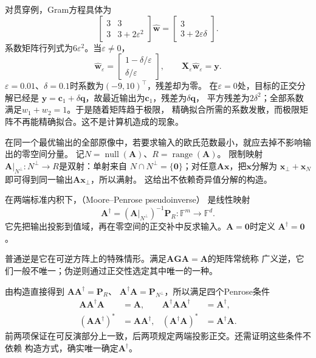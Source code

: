 对贯穿例，Gram方程具体为
\[
 \begin{bmatrix}3&3\\3&3+2\varepsilon^2\end{bmatrix}\widehat{\bm w}
 =\begin{bmatrix}3\\3+2\varepsilon\delta\end{bmatrix}.
\]
系数矩阵行列式为$6\varepsilon^2$。当$\varepsilon\neq0$，
\begin{equation}
 \widehat{\bm w}_\varepsilon
 =\begin{bmatrix}1-\delta/\varepsilon\\\delta/\varepsilon\end{bmatrix},
 \qquad\bm X_\varepsilon\widehat{\bm w}_\varepsilon=\bm y.
 \label{eq:linear-algebra-nearly-collinear-least-squares}
\end{equation}
$\varepsilon=0.01$、$\delta=0.1$时系数为$(-9,10)^\top$，残差却为零。
在$\varepsilon=0$处，目标的正交分解已经是
$\bm y=\bm c_1+\delta\bm q$，故最近输出为$\bm c_1$，残差为$\delta\bm q$，
平方残差为$2\delta^2$；全部系数满足$w_1+w_2=1$。于是随着矩阵趋于极限，
精确拟合所需的系数发散，而极限矩阵不再能精确拟合。这不是计算机造成的现象。


在同一个最优输出的全部原像中，若要求输入的欧氏范数最小，就应去掉不影响输出的零空间分量。
记$N=\operatorname{null}(\bm A)$、$R=\operatorname{range}(\bm A)$。
限制映射$\bm A|_{N^\perp}:N^\perp\to R$是双射：单射来自
$N\cap N^\perp=\{\bm0\}$；对任意$\bm A\bm x$，把$\bm x$分解为
$\bm x_\perp+\bm x_N$即可得到同一输出$\bm A\bm x_\perp$，所以满射。
这给出不依赖奇异值分解的构造。

\begin{definition}
\label{def:matrix-analysis-pseudoinverse}
在两端标准内积下，（Moore--Penrose pseudoinverse）
是线性映射
\[
 \bm A^\dagger=(\bm A|_{N^\perp})^{-1}\bm P_R:
 \mathbb F^m\longrightarrow\mathbb F^d.
\]
它先把输出投影到值域，再在零空间的正交补中反求输入。$\bm A=\bm0$时定义
$\bm A^\dagger=\bm0$。
\end{definition}
普通逆是它在可逆方阵上的特殊情形。满足$\bm A\bm G\bm A=\bm A$的矩阵常统称
广义逆，它们一般不唯一；伪逆则通过正交性选定其中唯一的一种。

由构造直接得到
$\bm A\bm A^\dagger=\bm P_R$、
$\bm A^\dagger\bm A=\bm P_{N^\perp}$，所以满足四个Penrose条件
\[
 \begin{aligned}
 \bm A\bm A^\dagger\bm A&=\bm A,&
 \bm A^\dagger\bm A\bm A^\dagger&=\bm A^\dagger,\\
 (\bm A\bm A^\dagger)^*&=\bm A\bm A^\dagger,&
 (\bm A^\dagger\bm A)^*&=\bm A^\dagger\bm A.
 \end{aligned}
\]
前两项保证在可反演部分上一致，后两项规定两端投影正交。还需证明这些条件不依赖
构造方式，确实唯一确定$\bm A^\dagger$。


